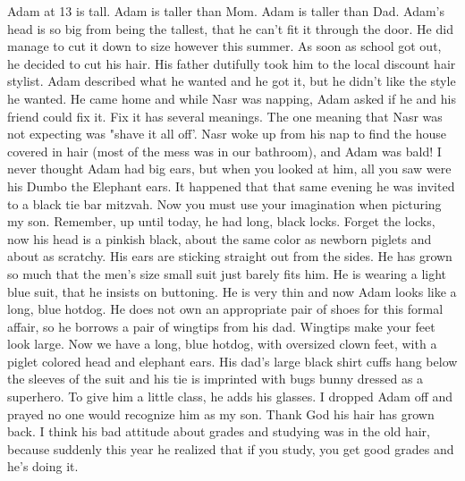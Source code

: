 Adam at 13 is tall. Adam is taller than Mom. Adam is taller than Dad. Adam's head is so big from being the tallest, that he can't fit it through
the door. He did manage to cut it down to size however this summer. As soon as school got out, he decided to cut his hair. His father dutifully
took him to the local discount hair stylist. Adam described what he wanted and he got it, but he didn't like the style he wanted. He came home
and while Nasr was napping, Adam asked if he and his friend could fix it. Fix it has several meanings. The one meaning that Nasr was not
expecting was "shave it all off'. Nasr woke up from his nap to find the house covered in hair (most of the mess was in our bathroom), and Adam
was bald! I never thought Adam had big ears, but when you looked at him, all you saw were his Dumbo the Elephant ears. It happened that that
same evening he was invited to a black tie bar mitzvah. Now you must use your imagination when picturing my son. Remember, up until today, he
had long, black locks. Forget the locks, now his head is a pinkish black, about the same color as newborn piglets and about as scratchy. His
ears are sticking straight out from the sides. He has grown so much that the men's size small suit just barely fits him. He is wearing a light
blue suit, that he insists on buttoning. He is very thin and now Adam looks like a long, blue hotdog. He does not own an appropriate pair of
shoes for this formal affair, so he borrows a pair of wingtips from his dad. Wingtips make your feet look large. Now we have a long, blue
hotdog, with oversized clown feet, with a piglet colored head and elephant ears. His dad's large black shirt cuffs hang below the sleeves of the
suit and his tie is imprinted with bugs bunny dressed as a superhero. To give him a little class, he adds his glasses. I dropped Adam off and
prayed no one would recognize him as my son. Thank God his hair has grown back. I think his bad attitude about grades and studying was in the
old hair, because suddenly this year he realized that if you study, you get good grades and he's doing it.

